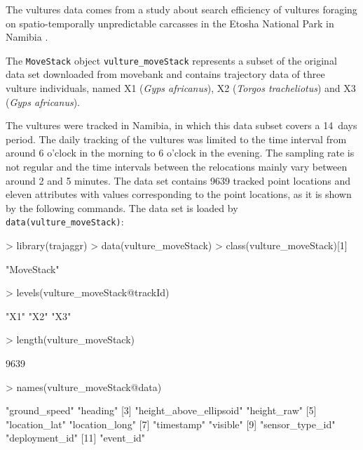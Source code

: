 \documentclass[12pt, oneside, a4paper]{scrbook}
\let\code=\texttt
\begin{document}
The vultures data comes from a study about search efficiency of vultures foraging on spatio-temporally unpredictable carcasses in the Etosha National Park in Namibia \citep{spiegel_factors_2013}.
\par\medskip

The \code{MoveStack} object \code{vulture\_moveStack} represents a subset of the original data set downloaded from movebank and contains trajectory data of three vulture individuals, named X1 (\textit{Gyps africanus}), X2 (\textit{Torgos tracheliotus}) and X3 (\textit{Gyps africanus}). 
\par\medskip

The vultures were tracked in Namibia, in which this data subset covers a 14~days period. The daily tracking of the vultures was limited to the time interval from around 6 o'clock in the morning to 6 o'clock in the evening. The sampling rate is not regular and the time intervals between the relocations mainly vary between around 2 and 5 minutes. The data set contains 9639 tracked point locations and eleven attributes with values corresponding to the point locations, as it is shown by the following commands. The data set is loaded by \code{data(vulture\_moveStack)}:
\par\medskip


\begin{small}
\end{small}

\begin{small}
\begin{Schunk}
\begin{Sinput}
> library(trajaggr)
> data(vulture_moveStack)
> class(vulture_moveStack)[1]
\end{Sinput}
\begin{Soutput}
[1] "MoveStack"
\end{Soutput}
\begin{Sinput}
> levels(vulture_moveStack@trackId)
\end{Sinput}
\begin{Soutput}
[1] "X1" "X2" "X3"
\end{Soutput}
\begin{Sinput}
> length(vulture_moveStack)
\end{Sinput}
\begin{Soutput}
[1] 9639
\end{Soutput}
\begin{Sinput}
> names(vulture_moveStack@data)
\end{Sinput}
\begin{Soutput}
 [1] "ground_speed"           "heading"               
 [3] "height_above_ellipsoid" "height_raw"            
 [5] "location_lat"           "location_long"         
 [7] "timestamp"              "visible"               
 [9] "sensor_type_id"         "deployment_id"         
[11] "event_id"              
\end{Soutput}
\end{Schunk}
\end{small}
\end{document}
